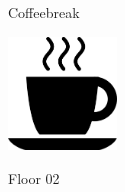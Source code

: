 \documentclass[a4paper]{article}
\begin{document}
\printGenericVSLHeader
\begin{center}
\begin{vsltext}{3cm}{4cm}
    Coffeebreak

    \includegraphics[height=3cm, keepaspectratio=true]{coffeecup.png}


    \vspace{1cm}

    Floor 02
\end{vsltext}

\end{center}
\end{document}
